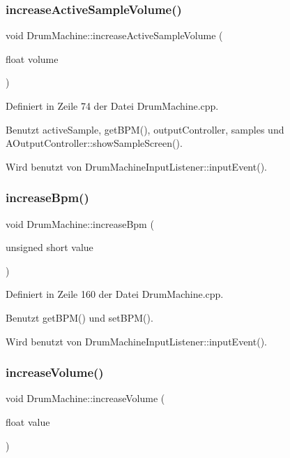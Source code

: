 \subsubsection{\texorpdfstring{increase\+Active\+Sample\+Volume()}{increaseActiveSampleVolume()}}
{\footnotesize\ttfamily void Drum\+Machine\+::increase\+Active\+Sample\+Volume (\begin{DoxyParamCaption}\item[{float}]{volume }\end{DoxyParamCaption})}



Definiert in Zeile 74 der Datei Drum\+Machine.\+cpp.



Benutzt active\+Sample, get\+B\+P\+M(), output\+Controller, samples und A\+Output\+Controller\+::show\+Sample\+Screen().



Wird benutzt von Drum\+Machine\+Input\+Listener\+::input\+Event().

\mbox{\label{class_drum_machine_ab40423c6a37efad94389ffb19a0ccae9}} 
\subsubsection{\texorpdfstring{increase\+Bpm()}{increaseBpm()}}
{\footnotesize\ttfamily void Drum\+Machine\+::increase\+Bpm (\begin{DoxyParamCaption}\item[{unsigned short}]{value }\end{DoxyParamCaption})}



Definiert in Zeile 160 der Datei Drum\+Machine.\+cpp.



Benutzt get\+B\+P\+M() und set\+B\+P\+M().



Wird benutzt von Drum\+Machine\+Input\+Listener\+::input\+Event().

\mbox{\label{class_drum_machine_ab823055aa6c1fa1dd91b1e45f3e66f0f}} 
\subsubsection{\texorpdfstring{increase\+Volume()}{increaseVolume()}}
{\footnotesize\ttfamily void Drum\+Machine\+::increase\+Volume (\begin{DoxyParamCaption}\item[{float}]{value }\end{DoxyParamCaption})}



